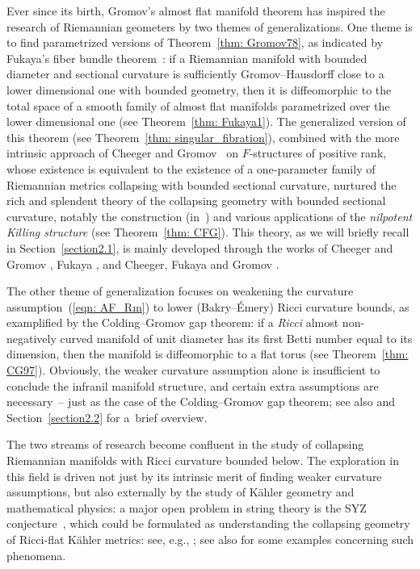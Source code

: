 \documentclass[10pt,a4paper]{amsart}
\numberwithin{equation}{section}
\begin{document}
Ever since its birth, Gromov's almost flat manifold theorem has inspired the
research of Riemannian geometers by two themes of generalizations. One theme
is to find parametrized versions of Theorem~\ref{thm: Gromov78}, as indicated by
Fukaya's fiber bundle theorem~\cite{Fukaya87ld}: if a Riemannian manifold with
bounded diameter and sectional curvature is sufficiently Gromov--Hausdorff close
to a lower dimensional one with bounded geometry, then it is diffeomorphic to
the total space of a smooth family of almost flat manifolds parametrized over
the lower dimensional one (see Theorem~\ref{thm: Fukaya1}). The generalized
version of this theorem (see Theorem~\ref{thm: singular_fibration}), combined
with the more intrinsic approach of Cheeger and Gromov~\cite{CGI, CGII} on
$F$-structures of positive rank, whose existence is equivalent to the existence
of a one-parameter family of Riemannian metrics collapsing with bounded
sectional curvature, nurtured the rich and splendent theory of the collapsing
geometry with bounded sectional curvature, notably the construction (in~\cite{CFG92}) and various applications of the \emph{nilpotent Killing
structure} (see Theorem~\ref{thm: CFG}). This theory,
as we will briefly recall in Section~\ref{section2.1}, is mainly developed through the works of
Cheeger and Gromov \cite{CGI, CGII}, Fukaya \cite{Fukaya87mGH, Fukaya87ld,
Fukaya88, Fukaya89}, and Cheeger, Fukaya and Gromov \cite{CFG92}.

The other theme of generalization focuses on weakening the curvature assumption~(\ref{eqn: AF_Rm}) to lower (Bakry--\'Emery) Ricci curvature bounds, as
examplified by the Colding--Gromov gap theorem: if a \emph{Ricci} almost
non-negatively curved manifold of unit diameter has its first Betti number
equal to its dimension, then the manifold is diffeomorphic to a flat torus
(see Theorem~\ref{thm: CG97}). Obviously, the weaker curvature assumption alone
is insufficient to conclude the infranil manifold structure, and certain extra
assumptions are necessary~-- just as the case of the Colding--Gromov gap
theorem; see also \cite{DWY96, HKRX18, Kapovitch19, PWY99} and Section~\ref{section2.2} for a~brief overview.

The two streams of research become confluent in the study of collapsing
Riemannian manifolds with Ricci curvature bounded below. The exploration in
this field is driven not just by its intrinsic merit of finding weaker
curvature assumptions, but also externally by the study of K\"ahler
geometry and mathematical physics: a major open problem in string theory is the
SYZ conjecture~\cite{SYZ}, which could be formulated as understanding the
collapsing geometry of Ricci-flat K\"ahler metrics: see, e.g., \cite{KS01, Li19,
Tossatti20}; see also \cite{ GTZ13, GTZ16,GW00, HSVZ18} for some examples
concerning such phenomena.
\end{document}
